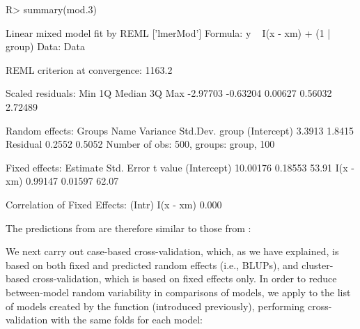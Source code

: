 \documentclass[
]{jss}
\begin{document}
\begin{CodeChunk}
\begin{CodeInput}
R> summary(mod.3)
\end{CodeInput}
\begin{CodeOutput}
Linear mixed model fit by REML ['lmerMod']
Formula: y ~ I(x - xm) + (1 | group)
   Data: Data

REML criterion at convergence: 1163.2

Scaled residuals: 
     Min       1Q   Median       3Q      Max 
-2.97703 -0.63204  0.00627  0.56032  2.72489 

Random effects:
 Groups   Name        Variance Std.Dev.
 group    (Intercept) 3.3913   1.8415  
 Residual             0.2552   0.5052  
Number of obs: 500, groups:  group, 100

Fixed effects:
            Estimate Std. Error t value
(Intercept) 10.00176    0.18553   53.91
I(x - xm)    0.99147    0.01597   62.07

Correlation of Fixed Effects:
          (Intr)
I(x - xm) 0.000 
\end{CodeOutput}
\end{CodeChunk}

The predictions from  are therefore similar to those from
:

We next carry out case-based cross-validation, which, as we have
explained, is based on both fixed and predicted random effects (i.e.,
BLUPs), and cluster-based cross-validation, which is based on fixed
effects only. In order to reduce between-model random variability in
comparisons of models, we apply  to the list of models
created by the  function (introduced previously),
performing cross-validation with the same folds for each model:
\end{document}
